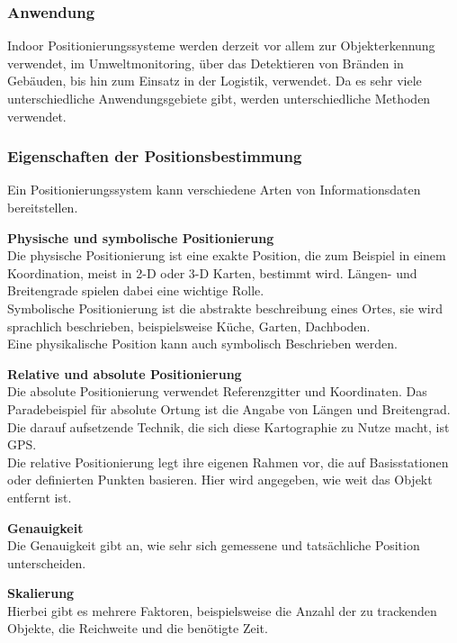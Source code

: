     \subsubsection{Anwendung} 
    Indoor Positionierungssysteme werden derzeit vor allem zur Objekterkennung verwendet, im Umweltmonitoring, über das Detektieren von Bränden in Gebäuden, bis hin zum Einsatz in der Logistik, verwendet. Da es sehr viele unterschiedliche Anwendungsgebiete gibt, werden unterschiedliche Methoden verwendet. \cite{posAnwendung}

    \subsubsection{Eigenschaften der Positionsbestimmung}

    Ein Positionierungssystem kann verschiedene Arten von Informationsdaten bereitstellen. \cite{pos_eigenschaften}

    \textbf{Physische und symbolische Positionierung}\\
    Die physische Positionierung ist eine exakte Position, die zum Beispiel in einem Koordination, meist in 2-D oder 3-D Karten, bestimmt wird. Längen- und Breitengrade spielen dabei eine wichtige Rolle.\\
    Symbolische Positionierung ist die abstrakte beschreibung eines Ortes, sie wird sprachlich beschrieben, beispielsweise Küche, Garten, Dachboden.\\
    Eine physikalische Position kann auch symbolisch Beschrieben werden.
    
    \textbf{Relative und absolute Positionierung}\\
    Die absolute Positionierung verwendet Referenzgitter und Koordinaten. Das Paradebeispiel für absolute Ortung ist die Angabe von Längen­ und Breitengrad.   Die darauf aufsetzende Technik, die sich diese Kartographie zu Nutze macht, ist GPS. \\
    Die relative Positionierung legt ihre eigenen Rahmen vor, die auf Basisstationen oder definierten Punkten basieren. Hier wird angegeben, wie weit das Objekt entfernt ist.

    \textbf{Genauigkeit}\\
    Die Genauigkeit gibt an, wie sehr sich gemessene und tatsächliche Position unterscheiden.

    \textbf{Skalierung}\\
    Hierbei gibt es mehrere Faktoren, beispielsweise die Anzahl der zu trackenden Objekte, die Reichweite und die benötigte Zeit.

